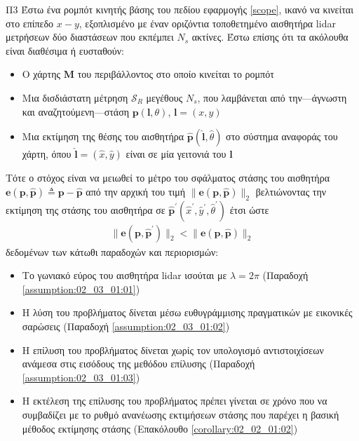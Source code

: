 \begin{bw_box}
\begin{customproblem}{Π3}
  \label{prob:02_04}
  Έστω ένα ρομπότ κινητής βάσης του πεδίου εφαρμογής \ref{scope}, ικανό να
  κινείται στο επίπεδο $x-y$, εξοπλισμένο με έναν οριζόντια τοποθετημένο
  αισθητήρα lidar μετρήσεων δύο διαστάσεων που εκπέμπει $N_s$ ακτίνες. Έστω
  επίσης ότι τα ακόλουθα είναι διαθέσιμα ή ευσταθούν:
  \begin{itemize}
    \item Ο χάρτης $\bm{M}$ του περιβάλλοντος στο οποίο κινείται το ρομπότ
    \item Μια δισδιάστατη μέτρηση $\mathcal{S}_R$ μεγέθους $N_s$, που λαμβάνεται
          από την---άγνωστη και αναζητούμενη---στάση $\bm{p}(\bm{l},\theta)$,
          $\bm{l} = (x,y)$
    \item Μια εκτίμηση της θέσης του αισθητήρα
          $\hat{\bm{p}}(\hat{\bm{l}}, \hat{\theta})$ στο σύστημα αναφοράς του
          χάρτη, όπου $\hat{\bm{l}} = (\hat{x}, \hat{y})$ είναι σε μία γειτονιά
          του $\bm{l}$
  \end{itemize}
\end{customproblem}
Τότε ο στόχος είναι να μειωθεί το μέτρο του σφάλματος στάσης του αισθητήρα
$\bm{e}(\bm{p}, \hat{\bm{p}}) \triangleq \bm{p}- \hat{\bm{p}}$ από την αρχική
του τιμή $\|\bm{e}(\bm{p}, \hat{\bm{p}})\|_2$
βελτιώνοντας την εκτίμηση της στάσης του αισθητήρα σε
$\hat{\bm{p}}^\prime(\hat{x}^\prime, \hat{y}^\prime, \hat{\theta}^\prime)$
έτσι ώστε
\begin{align}
  \|\bm{e}(\bm{p}, \hat{\bm{p}}^\prime)\|_2 < \|\bm{e}(\bm{p}, \hat{\bm{p}})\|_2
  \tag{$\astt$}
  \label{objective:02_04}
\end{align}
δεδομένων των κάτωθι παραδοχών και περιορισμών:
\begin{itemize}
  \item Το γωνιακό εύρος του αισθητήρα lidar ισούται με $\lambda = 2\pi$
        (Παραδοχή \ref{assumption:02_03_01:01})
  \item Η λύση του προβλήματος δίνεται μέσω ευθυγράμμισης πραγματικών με εικονικές
        σαρώσεις (Παραδοχή \ref{assumption:02_03_01:02})
  \item Η επίλυση του προβλήματος δίνεται χωρίς τον υπολογισμό αντιστοιχίσεων
        ανάμεσα στις εισόδους της μεθόδου επίλυσης (Παραδοχή
        \ref{assumption:02_03_01:03})
  \item Η εκτέλεση της επίλυσης του προβλήματος πρέπει γίνεται σε χρόνο που να
        συμβαδίζει με το ρυθμό ανανέωσης εκτιμήσεων στάσης που παρέχει η βασική
        μέθοδος εκτίμησης στάσης (Επακόλουθο \ref{corollary:02_02_01:02})
\end{itemize}

\end{bw_box}
